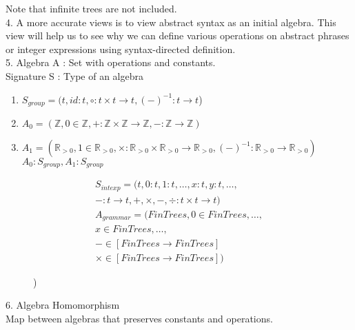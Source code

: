 \documentclass{report}[12pt]
\begin{document}
Note that infinite trees are not included. \\
4. A more accurate views is to view abstract syntax as an initial algebra. This view will help us to see why we can define various operations on abstract phrases or integer expressions using syntax-directed definition. \\
5. Algebra A : Set with operations and constants. \\
Signature S : Type of an algebra \\
\begin{enumerate}
    \item $S_{group} = (t, id:t, \circ:t\times t \rightarrow t, (-)^{-1}:t\rightarrow t$)
    \item $A_0 = (\mathbb{Z}, 0\in \mathbb{Z}, +:\mathbb{Z}\times \mathbb{Z}\rightarrow \mathbb{Z}, -:\mathbb{Z}\rightarrow \mathbb{Z})$
    \item $A_1 = (\mathbb{R}_{>0}, 1 \in \mathbb{R}_{>0}, \times:\mathbb{R}_{>0}\times\mathbb{R}_{>0}\rightarrow \mathbb{R}_{>0}, (-)^{-1}:\mathbb{R}_{>0} \rightarrow \mathbb{R}_{>0})$ \\
    $A_0 : S_{group}, A_1:S_{group}$
\end{enumerate}
\begin{align*}
    S_{intexp} = (t, 0:t, 1:t, \ldots, x:t, y:t, \ldots, \\
    -:t\rightarrow t, +, \times, -, \div : t \times t \rightarrow t) \\
    A_{grammar} = (FinTrees, 0\in FinTrees, \ldots, \\
    x\in FinTrees, \ldots, \\
    - \in [FinTrees \rightarrow FinTrees] \\
    \times \in [FinTrees \rightarrow FinTrees])
\end{align*}
\begin{figure}[h]
     \hspace{1cm}
    )
\end{figure}
6. Algebra Homomorphism \\
Map between algebras that preserves constants and operations.
\end{document}
